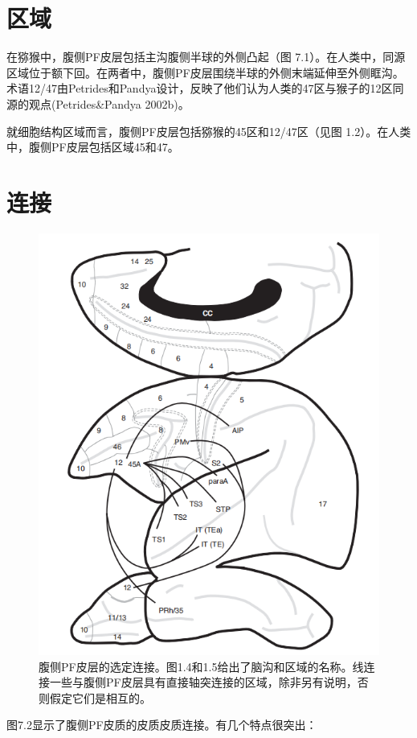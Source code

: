 \section{区域}
\par
在猕猴中，腹侧PF皮层包括主沟腹侧半球的外侧凸起（图 7.1）。在人类中，同源区域位于额下回。在两者中，腹侧PF皮层围绕半球的外侧末端延伸至外侧眶沟。术语12/47由Petrides和Pandya设计，反映了他们认为人类的47区与猴子的12区同源的观点(Petrides\&Pandya 2002b)。
\par
就细胞结构区域而言，腹侧PF皮层包括猕猴的45区和12/47区（见图 1.2）。在人类中，腹侧PF皮层包括区域45和47。
\section{连接}
\begin{figure}
	\centering
	\includegraphics[width=0.7\linewidth]{image_pfc/Fig_7_2}
	\caption{腹侧PF皮层的选定连接。图1.4和1.5给出了脑沟和区域的名称。线连接一些与腹侧PF皮层具有直接轴突连接的区域，除非另有说明，否则假定它们是相互的。}
	\label{fig:fig}
\end{figure}
图7.2显示了腹侧PF皮质的皮质皮质连接。有几个特点很突出：
